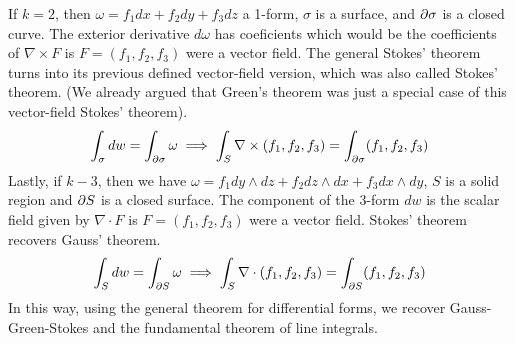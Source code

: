 \documentclass[fleqn,letterpaper]{report}
\begin{document}
If $k=2$, then $\omega = f_1 dx + f_2 dy + f_3 dz$ a
1-form, $\sigma$ is a surface, and $\partial \sigma$ is a closed
curve. The exterior derivative $d\omega$ has coeficients which
would be the coefficients of $\nabla \times F$ is $F =
(f_1,f_2,f_3)$ were a vector field. The general Stokes'
theorem turns into its previous defined vector-field version,
which was also called 
Stokes' theorem. (We already argued that Green's theorem was
just a special case of this vector-field Stokes' theorem).
\begin{equation*}
\int_\sigma dw = \int_{\partial \sigma} \omega \implies \int_S \nabla \times
(f_1, f_2, f_3) = \int_{\partial \sigma} (f_1, f_2, f_3) 
\end{equation*}
Lastly, if $k-3$, then we have $\omega = f_1 dy \wedge dz +
f_2 dz \wedge dx + f_3 dx \wedge dy$, $S$ is a solid region
and $\partial S$ is a closed surface. The component of the 3-form
$dw$ is the scalar field given by $\nabla \cdot F$ is $F =
(f_1,f_2,f_3)$ were a vector field. Stokes' theorem recovers 
Gauss' theorem.
\begin{equation*}
\int_S dw = \int_{\partial S} \omega \implies \int_S \nabla \cdot
(f_1, f_2, f_3) = \int_{\partial S} (f_1, f_2, f_3)
\end{equation*}
In this way, using the general theorem for differential forms,
we recover Gauss-Green-Stokes and the fundamental theorem of
line integrals.
\end{document}
